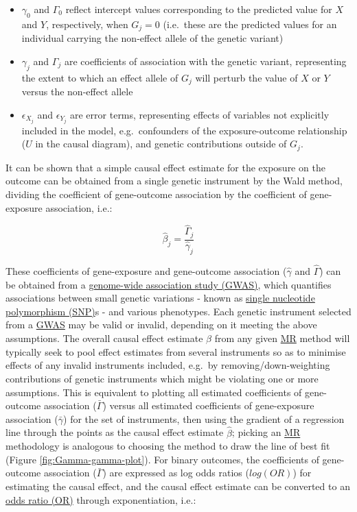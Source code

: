 \documentclass[
]{article}
\begin{document}
\begin{itemize}
\item
  \(\gamma_0\) and \(\Gamma_0\) reflect intercept values corresponding to the predicted value for \(X\) and \(Y\), respectively, when \(G_j = 0\) (i.e.~these are the predicted values for an individual carrying the non-effect allele of the genetic variant)
\item
  \(\gamma_j\) and \(\Gamma_j\) are coefficients of association with the genetic variant, representing the extent to which an effect allele of \(G_j\) will perturb the value of \(X\) or \(Y\) versus the non-effect allele
\item
  \(\epsilon_{X_j}\) and \(\epsilon_{Y_j}\) are error terms, representing effects of variables not explicitly included in the model, e.g.~confounders of the exposure-outcome relationship (\(U\) in the causal diagram), and genetic contributions outside of \(G_j\).
\end{itemize}

It can be shown that a simple causal effect estimate for the exposure on the outcome can be obtained from a single genetic instrument by the Wald method, dividing the coefficient of gene-outcome association by the coefficient of gene-exposure association, i.e.:

\begin{equation} 
\hat{\beta}_j = \frac {\hat{\Gamma}_j} {\hat{\gamma}_j}
\end{equation}

These coefficients of gene-exposure and gene-outcome association (\(\hat{\gamma}\) and \(\hat{\Gamma}\)) can be obtained from a \hyperref[acronyms_GWAS]{genome-wide association study (GWAS)}, which quantifies associations between small genetic variations - known as \hyperref[acronyms_SNP]{single nucleotide polymorphism (SNP)}s - and various phenotypes. Each genetic instrument selected from a \hyperref[acronyms_GWAS]{GWAS} may be valid or invalid, depending on it meeting the above assumptions. The overall causal effect estimate \(\hat{\beta}\) from any given \hyperref[acronyms_MR]{MR} method will typically seek to pool effect estimates from several instruments so as to minimise effects of any invalid instruments included, e.g.~by removing/down-weighting contributions of genetic instruments which might be violating one or more assumptions. This is equivalent to plotting all estimated coefficients of gene-outcome association (\(\bar{\Gamma}\)) versus all estimated coefficients of gene-exposure association (\(\bar{\gamma}\)) for the set of instruments, then using the gradient of a regression line through the points as the causal effect estimate \(\hat{\beta}\); picking an \hyperref[acronyms_MR]{MR} methodology is analogous to choosing the method to draw the line of best fit (Figure \ref{fig:Gamma-gamma-plot}). For binary outcomes, the coefficients of gene-outcome association (\(\bar{\Gamma}\)) are expressed as log odds ratios (\(log(OR)\)) for estimating the causal effect, and the causal effect estimate can be converted to an \hyperref[acronyms_OR]{odds ratio (OR)} through exponentiation, i.e.:
\end{document}
